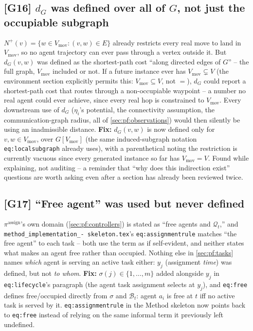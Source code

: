 \documentclass[11pt]{article}
\begin{document}
\subsection*{[G16] $d_G$ was defined over all of $G$, not just the occupiable subgraph}
$N^{+}(v) = \{w \in V_{\mathrm{mov}} : (v,w)\in E\}$ already restricts every
real move to land in $V_{\mathrm{mov}}$, so no agent trajectory can ever pass
through a vertex outside it. But $d_G(v,w)$ was defined as the shortest-path
cost ``along directed edges of $G$'' -- the full graph, $V_{\mathrm{mov}}$
included or not. If a future instance ever has $V_{\mathrm{mov}} \subsetneq
V$ (the environment section explicitly permits this: $V_{\mathrm{mov}}
\subseteq V$, not $=$), $d_G$ could report a shortest-path cost that routes
through a non-occupiable waypoint -- a number no real agent could ever
achieve, since every real hop is constrained to $V_{\mathrm{mov}}$. Every
downstream use of $d_G$ ($\eta_i$'s potential, the connectivity assumption,
the communication-graph radius, all of \ref{sec:pf:observations}) would then
silently be using an inadmissible distance. \textbf{Fix:} $d_G(v,w)$ is now
defined only for $v,w\in V_{\mathrm{mov}}$, over $G[V_{\mathrm{mov}}]$ (the
same induced-subgraph notation \texttt{eq:localsubgraph} already uses),
with a parenthetical noting the restriction is currently vacuous since every
generated instance so far has $V_{\mathrm{mov}}=V$. Found while explaining,
not auditing -- a reminder that ``why does this indirection exist'' questions
are worth asking even after a section has already been reviewed twice.

\subsection*{[G17] ``Free agent'' was used but never defined}
$\pi^{\mathrm{assign}}$'s own domain (\ref{sec:pf:controllers}) is stated as
``free agents and $\mathcal{Q}_t$,'' and \texttt{method\_implementation\_-
skeleton.tex}'s \texttt{eq:assignmentrule} matches ``the free agent'' to each
task -- both use the term as if self-evident, and neither states what makes
an agent free rather than occupied. Nothing else in \ref{sec:pf:tasks} names
\emph{which} agent is serving an active task either: $y_j$ (assignment
\emph{time}) was defined, but not \emph{to whom}. \textbf{Fix:} $\sigma(j)\in
\{1,\dots,m\}$ added alongside $y_j$ in \texttt{eq:lifecycle}'s paragraph
(the agent task assignment selects at $y_j$), and \texttt{eq:free} defines
free/occupied directly from $\sigma$ and $\mathcal{B}_t$: agent $a_i$ is free
at $t$ iff no active task is served by it. \texttt{eq:assignmentrule} in the
Method skeleton now points back to \texttt{eq:free} instead of relying on the
same informal term it previously left undefined.
\end{document}
